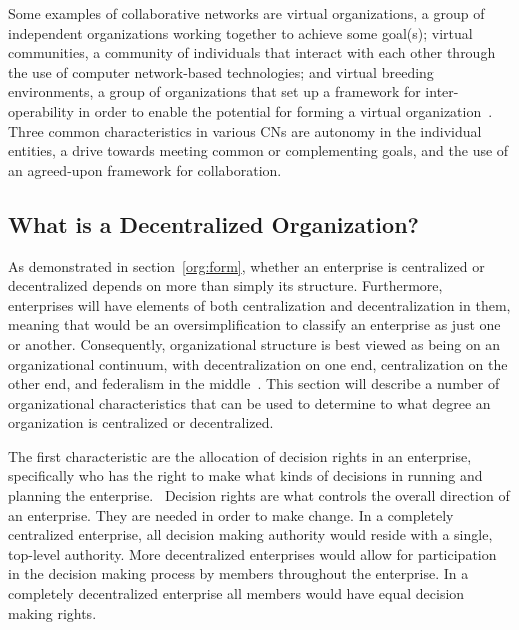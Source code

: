 Some examples of collaborative networks are virtual organizations, a group of independent organizations working together to achieve some goal(s); virtual communities, a community of individuals that interact with each other through the use of computer network-based technologies; and virtual breeding environments, a group of organizations that set up a framework for inter-operability in order to enable the potential for forming a virtual organization~\cite{Camarinha-Matos2005}. Three common characteristics in various CNs are autonomy in the individual entities, a drive towards meeting common or complementing goals, and the use of an agreed-upon framework for collaboration. 





\subsection{What is a Decentralized Organization?}

As demonstrated in section~\ref{org:form}, whether an enterprise is centralized or decentralized depends on more than simply its structure. Furthermore, enterprises will have elements of both centralization and decentralization in them, meaning that would be an oversimplification to classify an enterprise as just one or another. Consequently, organizational structure is best viewed as being on an organizational continuum, with decentralization on one end, centralization on the other end, and federalism in the middle~\cite{pearlson2009}. This section will describe a number of organizational characteristics that can be used to determine to what degree an organization is centralized or decentralized. 

The first characteristic are the allocation of decision rights in an enterprise, specifically who has the right to make what kinds of decisions in running and planning the enterprise.~\cite{pearlson2009} Decision rights are what controls the overall direction of an enterprise. They are needed in order to make change. In a completely centralized enterprise, all decision making authority would reside with a single, top-level authority. More decentralized enterprises would allow for participation in the decision making process by members throughout the enterprise. In a completely decentralized enterprise all members would have equal decision making rights. 

